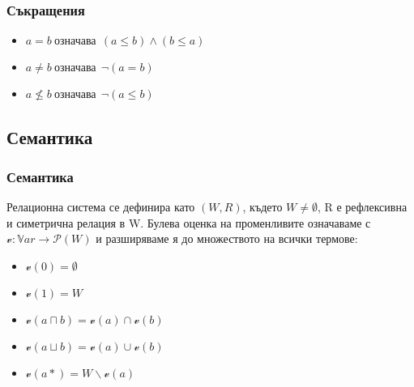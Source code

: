 \documentclass{beamer}
\begin{document}
\begin{frame}\frametitle{Съкращения}
		\begin{itemize}
		\item $a = b\:\textit{означава}\:\: (a \le b) \land (b \le a)$
		\item $a \neq b\:\textit{означава}\:\: \neg (a = b) $
		\item $a \nleq b\:\textit{означава}\:\: \neg (a \le b)$
		\end{itemize}
\end{frame}

\subsection{Семантика}
\begin{frame}\frametitle{Семантика}
	Релационна система се дефинира като $(W, R)$, където $W \neq \emptyset$, R е рефлексивна и симетрична релация в W.
	\newline
	\newline
	Булева оценка на променливите означаваме с  $\mathscr{v}: \mathbb{V}ar \rightarrow  \mathscr{P}(W)$ и разширяваме я до множеството на всички термове:
		\begin{itemize}
			\item $\mathscr{v}(0) = \emptyset$
			\item $\mathscr{v}(1) = W$
			\item $\mathscr{v}(a \sqcap b) = \mathscr{v}(a) \cap \mathscr{v}(b)$
			\item $\mathscr{v}(a \sqcup b) = \mathscr{v}(a) \cup \mathscr{v}(b)$
			\item $\mathscr{v}(a*) = W \backslash  \mathscr{v}(a)$
		\end{itemize}
	
\end{frame}
\end{document}
